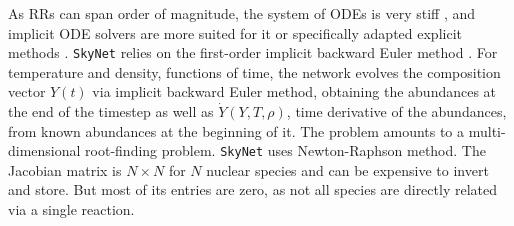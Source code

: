 %

As \acp{RR} can span order of magnitude, 
the system of \acp{ODE} is very stiff \citep{Timmes:1999,Hix:2005pf}, and implicit \ac{ODE} solvers 
are more suited for it \citet{Timmes:1999,Winteler:2012,Longland:2014} 
or specifically adapted explicit methods 
\citet{Feger:2011,Guidry:2011,Guidry:2012,Guidry:2011a,Guidry:2011b,Brock:2015}. 
\texttt{SkyNet} relies on the first-order implicit backward Euler method \citep{Hix:1999}. 
%
For temperature and density, functions of time, the network evolves the composition 
vector $Y(t)$ via implicit backward Euler method, obtaining the abundances at 
the end of the timestep as well as $\dot{Y}(Y,T,\rho)$, time derivative of the abundances, 
from known abundances at the beginning of it. 
%
The problem amounts to a multi-dimensional root-finding problem. \texttt{SkyNet} uses 
Newton-Raphson method. The Jacobian matrix is $N\times N$ for $N$ nuclear species and can 
be expensive to invert and store. 
But most of its entries are zero, as not all species are directly related via a single reaction. 

